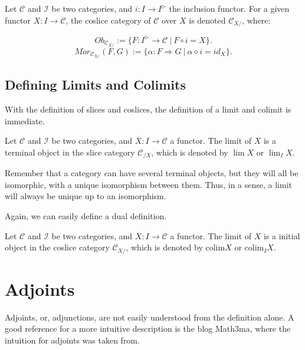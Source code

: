 \begin{definition}
  Let $\mathcal C$ and $\mathcal I$ be two categories, and $i:I \to I^{\rhd}$ the
  inclusion functor. For a given functor $X:I \to \mathcal C$, the coslice category
  of $\mathcal C$ over $X$ is denoted $\mathcal C_{X/}$, where:

  \begin{displaymath}
    Ob_{\mathcal C_{X/}}:=\{
      F: I^\rhd \to \mathcal C \ | \ F \circ i = X
    \}.
  \end{displaymath}
  \begin{displaymath}
    Mor_{\mathcal C_{X/}}(F,G):=\{
      \alpha: F \Rightarrow G \ | \ \alpha \diamond i = id_{X}
    \}.
  \end{displaymath}
\end{definition}

\subsection{Defining Limits and Colimits}

With the definition of slices and coslices, the definition of a limit and
colimit is immediate.
\begin{definition}[Limit]
  Let $\mathcal C$ and $\mathcal I$ be two categories, and $X:I \to \mathcal C$
  a functor. The limit of $X$ is a terminal object in the slice category
  $\mathcal C_{/X}$, which is denoted by $\lim X$ or $\lim_I X$.
\end{definition}

Remember that a category can have several terminal objects, but they will all
be isomorphic, with a unique isomorphism between them. Thus, in a sense, a limit
will always be unique up to an isomorphism.

Again, we can easily define a dual definition.

\begin{definition}[Colimit]
  Let $\mathcal C$ and $\mathcal I$ be two categories, and $X:I \to \mathcal C$
  a functor. The limit of $X$ is a initial object in the coslice category
  $\mathcal C_{X/}$, which is denoted by $\text{colim} X$ or $\text{colim}_I X$.
\end{definition}


\section{Adjoints}

Adjoints, or, adjunctions, are not easily understood from the definition alone. 
A good reference for a more intuitive description is the blog Math3ma, where the
intuition for adjoints was taken from.

